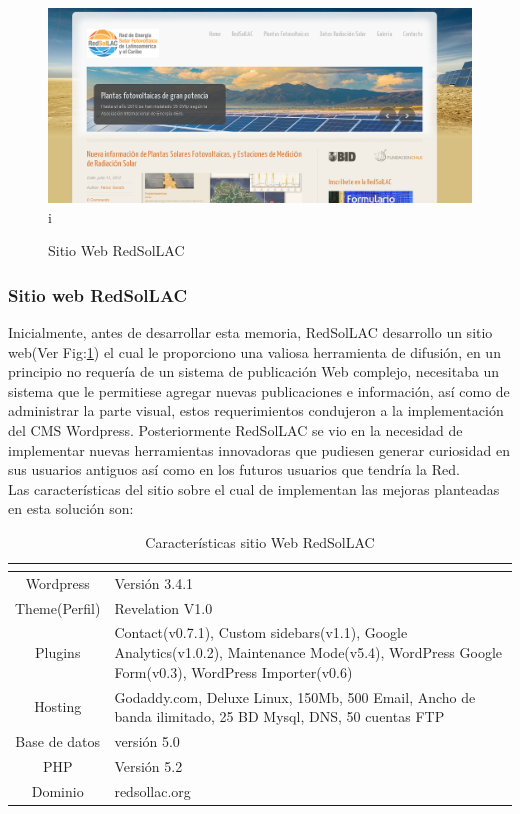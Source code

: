 \begin{figure}[h!]
        \centering
        \includegraphics[scale=0.3]{images/webRedSolLAC}i
        \caption{Sitio Web RedSolLAC}
        \label{webRed}
\end{figure}

\subsubsection{Sitio web RedSolLAC}
Inicialmente, antes de desarrollar esta memoria, RedSolLAC desarrollo un sitio web(Ver Fig:\ref{webRed}) el cual le proporciono una valiosa herramienta de difusión, en un principio no requería de un sistema de publicación Web complejo, necesitaba un sistema que le permitiese agregar nuevas publicaciones e información, así como de administrar la parte visual, estos requerimientos condujeron a la implementación del CMS Wordpress. Posteriormente RedSolLAC se vio en la necesidad de implementar nuevas herramientas innovadoras que pudiesen generar curiosidad en sus usuarios antiguos así como en los futuros usuarios que tendría la Red.\\

Las características del sitio sobre el cual de implementan las mejoras planteadas en esta solución son:
\begin{table}[h!]
\caption{Características sitio Web RedSolLAC}
\begin{tabular}{| c | p{11cm} |}
        \hline
        \textbf{}  &       \textbf{}        \\
        \hline
	Wordpress&Versión 3.4.1\\
	\hline
	Theme(Perfil)&Revelation V1.0\\
	\hline
	Plugins&Contact(v0.7.1), Custom sidebars(v1.1), Google Analytics(v1.0.2), Maintenance Mode(v5.4), WordPress Google Form(v0.3), WordPress Importer(v0.6)\\
	\hline
	Hosting&Godaddy.com, Deluxe Linux, 150Mb, 500 Email, Ancho de banda ilimitado, 25 BD Mysql, DNS, 50 cuentas FTP\\
	\hline
	Base de datos&versión 5.0\\
	\hline
	PHP&Versión 5.2\\
	\hline
	Dominio&redsollac.org\\
	\hline
\end{tabular}
\end{table}




